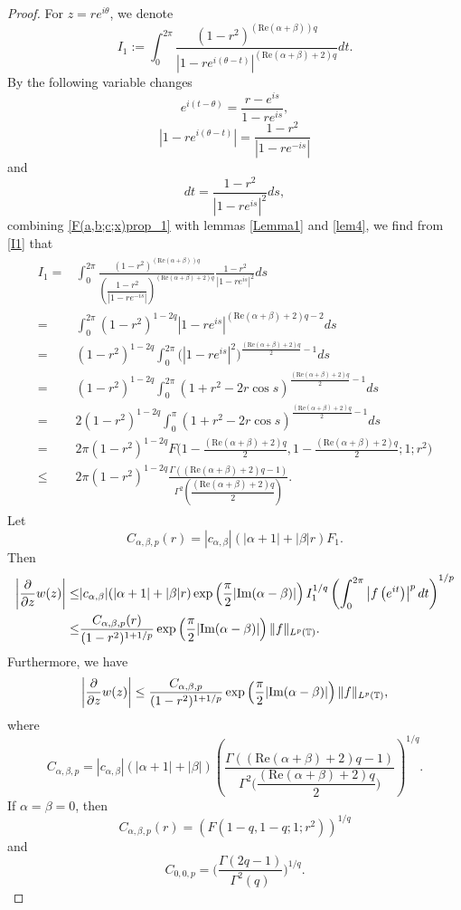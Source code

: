 \documentclass[11pt, reqno]{amsart}
\theoremstyle{definition}
\numberwithin{equation}{section}
\newcommand{\abs}[1]{\left\vert#1\right\vert}
\theoremstyle{remark}
\numberwithin{equation}{section}
\begin{document}
\begin{proof}
		For $z=re^{i\theta}$, we denote
		\begin{equation}\label{I1}
			I_1:=\int_0^{2\pi}\frac{(1-r^2)^{(\text{Re}(\alpha+\beta))q}}{|1-re^{i(\theta-t)}|^{(\text{Re}(\alpha+\beta)+2)q}}dt.
		\end{equation} 
		By the following variable changes $$e^{i(t-\theta)}=\frac{r-e^{is}}{1-re^{is}},$$ $$\abs{1-re^{i(\theta-t)}}=\frac{1-r^2}{\abs{1-re^{-is}}}$$ and $$dt=\frac{1-r^2}{|1-re^{is}|^2}ds,$$ combining \eqref{F(a,b;c;x)prop_1} with lemmas \ref{Lemma1} and \ref{lem4}, we find from \eqref{I1} that
		\begin{align*}
           \begin{split}
			I_1=&\int_0^{2\pi}\frac{(1-r^2)^{(\text{Re}(\alpha+\beta))q}}{\left(\dfrac{1-r^2}{|1-re^{-is}|}\right)^{(\text{Re}(\alpha+\beta)+2)q}}\frac{1-r^2}{|1-re^{is}|^2}ds\\=& \int_0^{2\pi}(1-r^2)^{1-2q}|1-re^{is}|^{(\text{Re}(\alpha+\beta)+2)q-2} ds\\=&(1-r^2)^{1-2q}\int_0^{2\pi}\big(|1-re^{is}|^2\big)^{\frac{(\text{Re}(\alpha+\beta)+2)q}{2}-1} ds\\=&(1-r^2)^{1-2q}\int_0^{2\pi}(1+r^2-2r\cos s)^{\frac{(\text{Re}(\alpha+\beta)+2)q}{2}-1} ds\\=&2(1-r^2)^{1-2q}\int_0^{\pi}(1+r^2-2r\cos s)^{\frac{(\text{Re}(\alpha+\beta)+2)q}{2}-1} ds\\=&2\pi(1-r^2)^{1-2q}F\bigg(1-\frac{(\text{Re}(\alpha+\beta)+2)q}{2},1-\frac{(\text{Re}(\alpha+\beta)+2)q}{2};1;r^2\bigg)\\\leq& 2\pi(1-r^2)^{1-2q} \frac{\Gamma((\text{Re}(\alpha+\beta)+2)q-1)}{\Gamma^2\left(\dfrac{(\text{Re}(\alpha+\beta)+2)q}{2}\right)}.   
            \end{split}
		\end{align*}
		Let $$C_{\alpha,\beta,p}(r)=|c_{\alpha,\beta}|(|\alpha +1 |+|\beta| r)F_1.$$
		Then 
		\begin{align*}
        \begin{split}
			\bigg|\frac{\partial}{\partial z}w(z)\bigg|\leq& |c_{\alpha,\beta}|(|\alpha +1 |+|\beta| r)\exp\left(\frac{\pi}{2}|\text{\rm Im}(\alpha-\beta)|\right)I_1^{1/q}\left(\int_0^{2\pi}\abs{f\left(e^{it}\right)}^pdt\right)^{1/p}\\\leq&\frac{C_{\alpha,\beta,p}(r)}{(1-r^2)^{1+1/p}}\exp\left(\frac{\pi}{2}|\text{\rm Im}(\alpha-\beta)|\right)\|f\|_{L^p(\mathbb{T})}.
            \end{split}
		\end{align*}
		Furthermore, we have $$\bigg|\frac{\partial}{\partial z}w(z)\bigg|\leq\frac{C_{\alpha,\beta,p}}{(1-r^2)^{1+1/p}}\exp\left(\frac{\pi}{2}|\text{\rm Im}(\alpha-\beta)|\right)\|f\|_{L^p(\mathbb{T})},$$ where $$C_{\alpha,\beta,p}=|c_{\alpha,\beta}|(|\alpha +1 |+|\beta| )\left(\frac{\Gamma((\text{Re}(\alpha+\beta)+2)q-1)}{\Gamma^2\bigg(\dfrac{(\text{Re}(\alpha+\beta)+2)q}{2}\bigg)}\right)^{1/q}.$$ If $\alpha=\beta=0$, then $$C_{\alpha,\beta,p}(r)=\left(F\left(1-q,1-q;1;r^2\right)\right)^{1/q}$$ and $$C_{0,0,p}=\bigg(\frac{\Gamma(2q-1)}{\Gamma^2(q)}\bigg)^{1/q}.$$
        

\end{proof}
\end{document}
